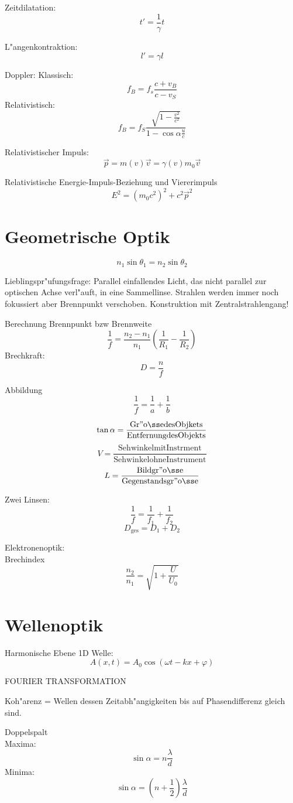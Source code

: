 \documentclass[12pt]{report}
\newcommand{\vphi}{\varphi}
\begin{document}
Zeitdilatation:
\[t'=\frac{1}{\gamma}t\]

L"angenkontraktion:
\[l'=\gamma l\]

Doppler:
Klassisch: \[f_B=f_s\frac{c+v_B}{c-v_S}\]
Relativistisch: \[f_B=f_S\frac{\sqrt{1-\frac{v^2}{c^2}}}{1-\cos\alpha\frac{u}{c}}\]

Relativistischer Impuls:
\[\vec{p}=m(v)\vec{v}=\gamma(v)m_0\vec{v}\]

Relativistische Energie-Impuls-Beziehung und Viererimpuls
\[E^2=(m_0c^2)^2+c^2\vec{p}^2\]

\section{Geometrische Optik}

\[n_1\sin\theta_1=n_2\sin\theta_2\]

Lieblingspr"ufungsfrage: Parallel einfallendes Licht, das nicht parallel zur optischen Achse verl"auft, in eine Sammellinse. Strahlen werden immer noch fokussiert aber Brennpunkt verschoben. Konstruktion mit Zentralstrahlengang!

Berechnung Brennpunkt bzw Brennweite
\[\frac{1}{f}=\frac{n_2-n_1}{n_1}\left(\frac{1}{R_1}-\frac{1}{R_2}\right)\]
Brechkraft: \[D=\frac{n}{f}\]

Abbildung \[\frac{1}{f}=\frac{1}{a}+\frac{1}{b}\]

\[\tan\alpha=\mathrm{\frac{Gr"o\ss e des Objkets}{Entfernung des Objekts}}\]
\[V=\mathrm{\frac{Sehwinkel mit Instrment}{Sehwinkel ohne Instrument}}\]
\[L=\mathrm{\frac{Bildgr"o\ss e}{Gegenstandsgr"o\ss e}}\]

Zwei Linsen:
\[\frac{1}{f}=\frac{1}{f_1}+\frac{1}{f_2}\]
\[D_\mathrm{ges}=D_1+D_2\]

Elektronenoptik:\\
Brechindex
\[\frac{n_2}{n_1}=\sqrt{1+\frac{U}{U_0}}\]

\section{Wellenoptik}

Harmonische Ebene 1D Welle:
\[A(x,t)=A_0\cos(\omega t-kx+\vphi)\]

FOURIER TRANSFORMATION

Koh"arenz = Wellen dessen Zeitabh"angigkeiten bis auf Phasendifferenz gleich sind.

Doppelspalt\\
Maxima: \[\sin\alpha=n\frac{\lambda}{d}\]
Minima: \[\sin\alpha=\left(n+\frac{1}{2}\right)\frac{\lambda}{d}\]
\end{document}

